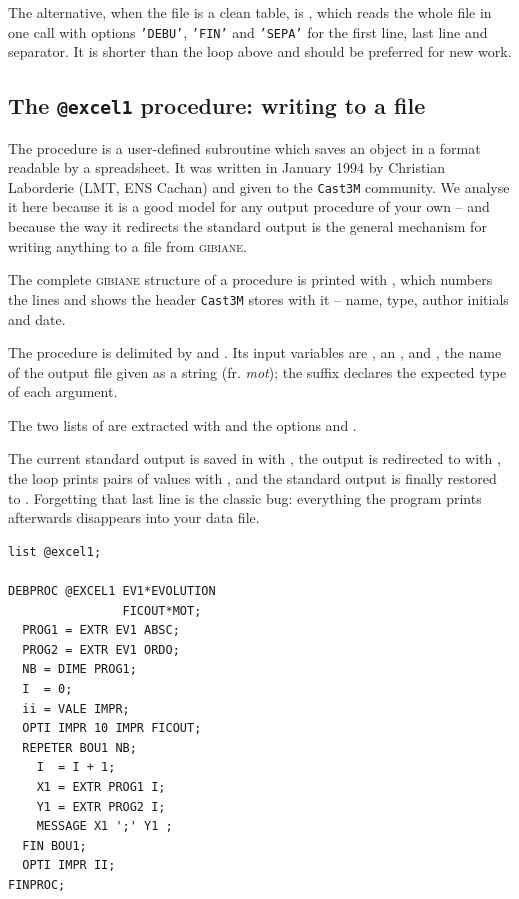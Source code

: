 \noindent The alternative, when the file is a clean table, is
, which reads the whole file in one call with options
\texttt{'DEBU'}, \texttt{'FIN'} and \texttt{'SEPA'} for the first line, last
line and separator. It is shorter than the loop above and should be preferred
for new work.

\subsection{The \texttt{@excel1} procedure: writing to a file}

The  procedure is a user-defined subroutine which saves an
 object in a format readable by a spreadsheet. It was written
in January 1994 by Christian Laborderie (LMT, ENS Cachan) and given to the
\texttt{Cast3M} community.
We analyse it here because it is a good model for any output procedure of
your own -- and because the way it redirects the standard output is the
general mechanism for writing anything to a file from \textsc{gibiane}.

\begin{castemcom}
The complete \textsc{gibiane} structure of a procedure is printed with
, which numbers the lines and shows the header \texttt{Cast3M}
stores with it -- name, type, author initials and date.

The procedure is delimited by 
 and . Its input
variables are , an , and , the name of the
output file given as a string (fr. \emph{mot}); the  suffix
declares the expected type of each argument.

The two lists of  are extracted with 
 and the options
 and .

The current standard output is saved in  with , the
output is redirected to  with , the loop prints
pairs of values with  , and the standard
output is finally restored to . Forgetting that last line is the
classic bug: everything the program prints afterwards disappears into your
data file.
\end{castemcom}
\begin{castemlines}
\begin{verbatim}
list @excel1;

DEBPROC @EXCEL1 EV1*EVOLUTION
                FICOUT*MOT;
  PROG1 = EXTR EV1 ABSC;
  PROG2 = EXTR EV1 ORDO;
  NB = DIME PROG1;
  I  = 0;
  ii = VALE IMPR;
  OPTI IMPR 10 IMPR FICOUT;
  REPETER BOU1 NB;
    I  = I + 1;
    X1 = EXTR PROG1 I;
    Y1 = EXTR PROG2 I;
    MESSAGE X1 ';' Y1 ;
  FIN BOU1;
  OPTI IMPR II;
FINPROC;
\end{verbatim}
\end{castemlines}

